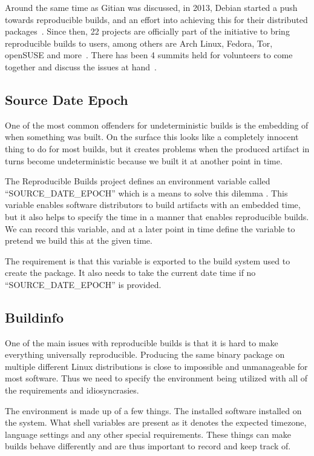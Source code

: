 \documentclass[../Main/thesis.tex]{subfiles}
\begin{document}
Around the same time as Gitian was discussed, in 2013, Debian started a push
towards reproducible builds, and an effort into achieving this for their
distributed packages~\cite{debian-repro-2013}. Since then, 22 projects are
officially part of the initiative to bring reproducible builds to users, among
others are Arch Linux, Fedora, Tor, openSUSE and more~\cite{repro-who}. There
has been 4 summits held for volunteers to come together and discuss the issues
at hand~\cite{repro-paris}.

\subsection*{Source Date Epoch}
One of the most common offenders for undeterministic builds is the embedding of
when something was built. On the surface this looks like a completely innocent
thing to do for most builds, but it creates problems when the produced artifact
in turns become undeterministic because we built it at another point in time.

The Reproducible Builds project defines an environment variable called
``SOURCE\_DATE\_EPOCH'' which is a means to solve this dilemma
\cite{reproducible-builds-2019-source-date-epoch}. This variable enables software
distributors to build artifacts with an embedded time, but it also helps to
specify the time in a manner that enables reproducible builds. We can record
this variable, and at a later point in time define the variable to pretend we
build this at the given time.

The requirement is that this variable is exported to the build system used to
create the package. It also needs to take the current date time if no
``SOURCE\_DATE\_EPOCH'' is provided.

\subsection*{Buildinfo}%
\label{sub:buildinfo}
One of the main issues with reproducible builds is that it is hard to make
everything universally reproducible. Producing the same binary package on
multiple different Linux distributions is close to impossible and unmanageable
for most software. Thus we need to specify the environment being utilized with
all of the requirements and idiosyncrasies.

The environment is made up of a few things. The installed software installed on
the system. What shell variables are present as it denotes the expected
timezone, language settings and any other special requirements. These things can
make builds behave differently and are thus important to record and keep track
of.
\end{document}

